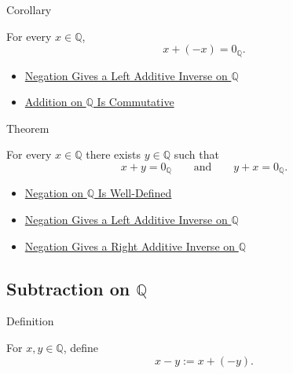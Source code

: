\begin{corollarybox}{Corollary}
\begin{corollary}
\label{cor:negation-right-additive-inverse-on-q}
For every $x\in\mathbb{Q}$,
\[
x+(-x)=0_{\mathbb{Q}}.
\]
\end{corollary}
\end{corollarybox}

\begin{dependencies}
\begin{itemize}
  \item \hyperref[thm:negation-left-additive-inverse-on-q]{Negation Gives a Left Additive Inverse on $\mathbb{Q}$}
  \item \hyperref[thm:addition-on-q-commutative]{Addition on $\mathbb{Q}$ Is Commutative}
\end{itemize}
\end{dependencies}

\begin{theorembox}{Theorem}
\begin{theorem}
\label{thm:every-rational-has-additive-inverse}
For every $x\in\mathbb{Q}$ there exists $y\in\mathbb{Q}$ such that
\[
x+y=0_{\mathbb{Q}}
\qquad\text{and}\qquad
y+x=0_{\mathbb{Q}}.
\]
\end{theorem}
\end{theorembox}

\begin{dependencies}
\begin{itemize}
  \item \hyperref[thm:negation-on-q-well-defined]{Negation on $\mathbb{Q}$ Is Well-Defined}
  \item \hyperref[thm:negation-left-additive-inverse-on-q]{Negation Gives a Left Additive Inverse on $\mathbb{Q}$}
  \item \hyperref[cor:negation-right-additive-inverse-on-q]{Negation Gives a Right Additive Inverse on $\mathbb{Q}$}
\end{itemize}
\end{dependencies}

\subsection*{\texorpdfstring{Subtraction on $\mathbb{Q}$}{Subtraction on Q}}

\begin{definitionbox}{Definition}
\begin{definition}
\label{def:subtraction-on-q}
For $x,y\in\mathbb{Q}$, define
\[
x-y:=x+(-y).
\]
\end{definition}
\end{definitionbox}

